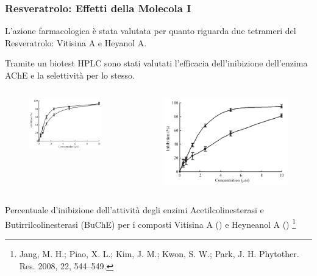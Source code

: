 \documentclass[9pt]{beamer}
\newcommand\blfootnote[1]{%
	\begingroup
	\renewcommand\thefootnote{}\footnote{#1}%
	\addtocounter{footnote}{-1}%
	\endgroup
}
\begin{document}
\begin{frame}
	\frametitle{Resveratrolo: Effetti della Molecola I}
	L'azione farmacologica è stata valutata per quanto riguarda due tetrameri del Resveratrolo: Vitisina A e Heyanol A.

	Tramite un biotest HPLC sono stati valutati l'efficacia dell'inibizione dell'enzima AChE e la selettività per lo stesso.

	\begin{columns}
		\begin{column}{0.5\textwidth}
			\begin{figure}
				\includegraphics[width=\textwidth]{immagini/risache_resveratrolo.png}
			\end{figure}
		\end{column}
		\begin{column}{0.5\textwidth}
			\begin{figure}
				\includegraphics[width=\textwidth]{immagini/risbuche_resveratrolo.png}
			\end{figure}
		\end{column}
	\end{columns}
	Percentuale d'inibizione dell'attività degli enzimi Acetilcolinesterasi e Butirrilcolinesterasi (BuChE) per i composti Vitisina A () e Heyneanol A ()
	\blfootnote{Jang, M. H.; Piao, X. L.; Kim, J. M.; Kwon, S. W.; Park, J. H.
		Phytother. Res. 2008, 22, 544–549.}
\end{frame}
\end{document}

